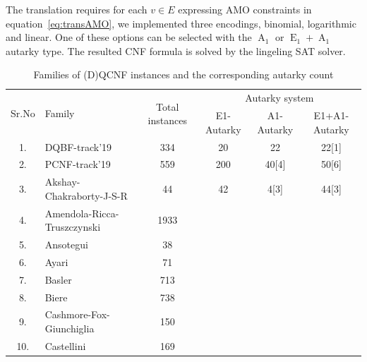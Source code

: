 \documentclass[runningheads]{llncs}
\DeclareMathOperator{\Aaut}{A}
\DeclareMathOperator{\Eaut}{E}
\begin{document}
The translation requires for each $v \in E$ expressing AMO constraints in equation~\ref{eq:transAMO}, we implemented three encodings, binomial, logarithmic and linear. One of these options can be selected with the $\Aaut_1$ or $\Eaut_1+\Aaut_1$ autarky type. The resulted CNF formula is solved by the lingeling \cite{Biere-SAT-Competition-2017-solvers} SAT solver.


\begin{table}
\caption{Families of (D)QCNF instances and the corresponding autarky count}\label{tab:aut-count}
\begin{tabular}{c|l|c|c|c|c}

\hline
   \multirow{2}{1cm}{Sr.No} &  \multirow{2}{3cm}{Family} &  \multirow{2}{2cm}{Total instances} & \multicolumn{3}{c}{Autarky system} \\
    \cline{4-6}
  & & & E1-Autarky & A1-Autarky & E1+A1-Autarky \\

\hline

1. & DQBF-track'19 &  334 & 20 & 22 & 22[1] \\ \hline
2. & PCNF-track'19 &  559 & 200 & 40[4] & 50[6] \\ \hline
3. & Akshay-Chakraborty-J-S-R &  44 & 42 & 4[3] & 44[3] \\ \hline
4. & Amendola-Ricca-Truszczynski & 1933 & &  &  \\ \hline

5. & Ansotegui &  38 & &  &  \\ \hline

6. & Ayari &  71 &  &  &  \\ \hline

7. & Basler &  713 & & &  \\ \hline

8. & Biere &  738 & &  &  \\ \hline

9. & Cashmore-Fox-Giunchiglia &  150 &  &  &  \\ \hline

10. & Castellini &  169 & &  &  \\ \hline


\end{tabular}
\end{table}
\end{document}
